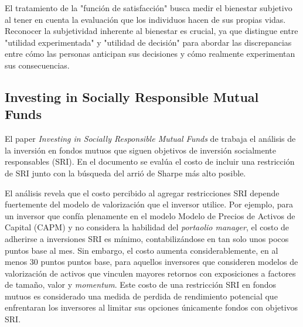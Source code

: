 El tratamiento de la "función de satisfacción" busca medir el bienestar subjetivo al tener en cuenta la evaluación que los individuos hacen de sus propias vidas. Reconocer la subjetividad inherente al bienestar es crucial, ya que distingue entre "utilidad experimentada" y "utilidad de decisión" para abordar las discrepancias entre cómo las personas anticipan sus decisiones y cómo realmente experimentan sus consecuencias. 

\subsection{Investing in Socially Responsible Mutual Funds}
El paper \textit{Investing in Socially Responsible Mutual Funds} de  trabaja el análisis de la inversión en fondos mutuos que siguen objetivos de inversión socialmente responsables (SRI). En el documento se evalúa el costo de incluir una restricción de SRI junto con la búsqueda del arrió de Sharpe más alto posible. 

El análisis revela que el costo percibido al agregar restricciones SRI depende fuertemente del modelo de valorización que el inversor utilice. Por ejemplo, para un inversor que confía plenamente en el modelo Modelo de Precios de Activos de Capital (CAPM) y no considera la habilidad del \textit{portaolio manager}, el costo de adherirse a inversiones SRI es mínimo, contabilizándose en tan solo unos pocos puntos base al mes. Sin embargo, el costo aumenta considerablemente, en al menos 30 puntos puntos base, para aquellos inversores que consideren modelos de valorización de activos que vinculen mayores retornos con exposiciones a factores de tamaño, valor y \textit{momentum}. Este costo de una restricción SRI en fondos mutuos es considerado una medida de perdida de rendimiento potencial que enfrentaran los inversores al limitar sus opciones únicamente fondos con objetivos SRI.